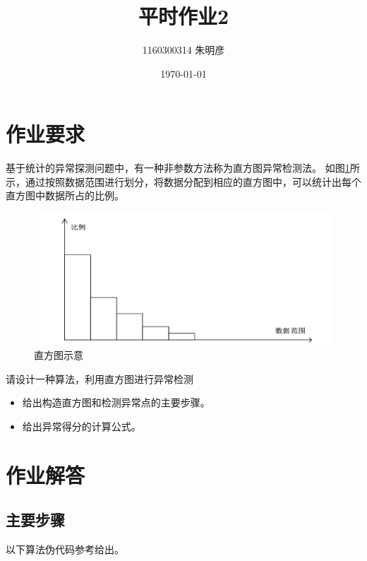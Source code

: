 \documentclass[12pt]{article}
\theoremstyle{definition}
\begin{document}
\title{平时作业2}
\author{1160300314 朱明彦}
\date{\today} %
\maketitle

\section{作业要求}
基于统计的异常探测问题中，有一种非参数方法称为直方图异常检测法。
如图\ref{fig:demand}所示，通过按照数据范围进行划分，将数据分配到相应的直方图中，可以统计出每个直方图中数据所占的比例。

\begin{figure}[H]
  \centering
  \includegraphics[width=0.8\linewidth]{fig/demand.png}
  \caption{直方图示意}
  \label{fig:demand}
\end{figure}

请设计一种算法，利用直方图进行异常检测
\begin{itemize}
  \item 给出构造直方图和检测异常点的主要步骤。
  \item 给出异常得分的计算公式。
\end{itemize}

\section{作业解答}
\subsection{主要步骤}
以下算法伪代码参考\cite{goldstein2012histogram}给出。
\end{document}
